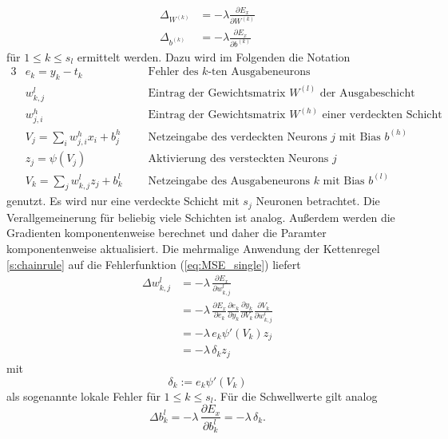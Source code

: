 \begin{align*}
    \Delta_{W^{(k)}} &= -\lambda \frac{\partial E_x}{\partial W^{(k)}} \\
    \Delta_{b^{(k)}} &= -\lambda \frac{\partial E_x}{\partial b^{(k)}} 
\end{align*}
für $1 \leq k \leq s_l$ ermittelt werden. Dazu wird im Folgenden die Notation \cite{du_diss}
\begin{alignat*}{3}
    &e_k=y_k-t_k &&\text{Fehler des $k$-ten Ausgabeneurons}  \\
    &w_{k,j}^l  &&\text{Eintrag der Gewichtsmatrix $W^{(l)}$ der Ausgabeschicht} \\
    &w_{j,i}^h   &&\text{Eintrag der Gewichtsmatrix $W^{(h)}$ einer verdeckten Schicht} \\
    &V_j=\sum_{i} w_{j,i}^h x_i +b^h_j \; \; \;  &&\text{Netzeingabe des verdeckten Neurons $j$ mit Bias $b^{(h)}$} \\
    &z_{j}= \psi \left(V_j\right) &&\text{Aktivierung des versteckten Neurons $j$}\\
    &V_k=\sum_{j} w_{k,j}^l z_j +b^l_k&&\text{Netzeingabe des Ausgabeneurons $k$ mit Bias $b^{(l)}$}  
\end{alignat*}
genutzt. Es wird nur eine verdeckte Schicht mit $s_j$ Neuronen betrachtet. Die Verallgemeinerung für beliebig viele Schichten ist analog. Außerdem werden die Gradienten komponentenweise berechnet und daher die Paramter komponentenweise aktualisiert. Die mehrmalige Anwendung der Kettenregel \ref{s:chainrule} auf die Fehlerfunktion (\ref{eq:MSE_single}) liefert
\begin{align*}
    \label{eq:delta_w_out}
\Delta w_{k,j}^l &= -\lambda\,\frac{\partial E_x}{\partial w_{k,j}^l} \\
                 &= -\lambda\,\frac{\partial E_x}{\partial e_{k}}
                            \frac{\partial e_k}{\partial y_k} 
                            \frac{\partial y_k}{\partial V_k}
                            \frac{\partial V_k}{\partial w_{k,j}^l}\\
                 &= -\lambda \,e_k \psi'(V_k) z_j \\
                 &= -\lambda \,\delta_k z_j           
\end{align*} 
mit 
\begin{equation*}
    \delta_k:= e_k \psi'(V_k)
\end{equation*}
als sogenannte lokale Fehler für $1 \leq k \leq s_l$.
Für die Schwellwerte gilt analog
\begin{equation*}
    \Delta b_k^l = -\lambda \, \frac{\partial E_x}{\partial b_{k}^l} 
                 = -\lambda \, \delta_k.
\end{equation*}

